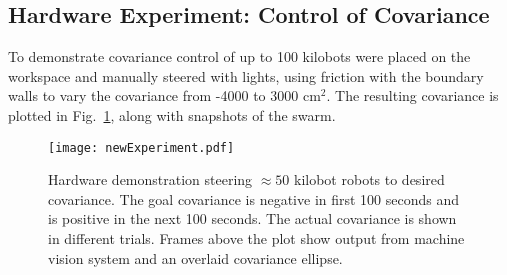 \subsection{Hardware Experiment: Control of Covariance}
To demonstrate covariance control of up to 100 kilobots were placed on the workspace and manually steered with lights, using friction with the boundary walls to vary the covariance from  -4000 to 3000 cm$^2$.  The resulting covariance is plotted in Fig.~\ref{fig:covExperiment}, along with snapshots of the swarm.




\begin{figure}
\begin{center}
	\texttt{[image: newExperiment.pdf]}
\end{center}
\vspace{-1em}
\caption{\label{fig:covExperiment}
Hardware demonstration steering $\approx 50$ kilobot robots to desired covariance. The goal covariance is negative in first 100 seconds and is positive in the next 100 seconds. The actual covariance is shown in different trials. Frames above the plot show output from machine vision system and an overlaid covariance ellipse.
\vspace{-1em}
}
\end{figure}


